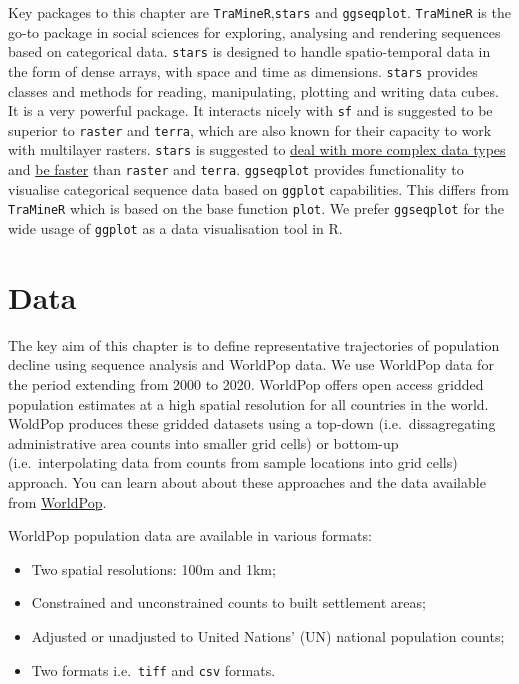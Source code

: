 \documentclass[
  letterpaper,
  DIV=11,
  numbers=noendperiod]{scrreprt}
\begin{document}
Key packages to this chapter are \texttt{TraMineR},\texttt{stars} and
\texttt{ggseqplot}. \texttt{TraMineR} is the go-to package in social
sciences for exploring, analysing and rendering sequences based on
categorical data. \texttt{stars} is designed to handle spatio-temporal
data in the form of dense arrays, with space and time as dimensions.
\texttt{stars} provides classes and methods for reading, manipulating,
plotting and writing data cubes. It is a very powerful package. It
interacts nicely with \texttt{sf} and is suggested to be superior to
\texttt{raster} and \texttt{terra}, which are also known for their
capacity to work with multilayer rasters. \texttt{stars} is suggested to
\href{https://r-spatial.github.io/stars/}{deal with more complex data
types} and
\href{https://www.r-bloggers.com/2021/05/a-comparison-of-terra-and-stars-packages/}{be
faster} than \texttt{raster} and \texttt{terra}. \texttt{ggseqplot}
provides functionality to visualise categorical sequence data based on
\texttt{ggplot} capabilities. This differs from \texttt{TraMineR} which
is based on the base function \texttt{plot}. We prefer
\texttt{ggseqplot} for the wide usage of \texttt{ggplot} as a data
visualisation tool in R.

\hypertarget{data}{%
\section{Data}\label{data}}

The key aim of this chapter is to define representative trajectories of
population decline using sequence analysis and WorldPop data. We use
WorldPop data for the period extending from 2000 to 2020. WorldPop
offers open access gridded population estimates at a high spatial
resolution for all countries in the world. WoldPop produces these
gridded datasets using a top-down (i.e.~dissagregating administrative
area counts into smaller grid cells) or bottom-up (i.e.~interpolating
data from counts from sample locations into grid cells) approach. You
can learn about about these approaches and the data available from
\href{https://www.worldpop.org}{WorldPop}.

WorldPop population data are available in various formats:

\begin{itemize}
\item
  Two spatial resolutions: 100m and 1km;
\item
  Constrained and unconstrained counts to built settlement areas;
\item
  Adjusted or unadjusted to United Nations' (UN) national population
  counts;
\item
  Two formats i.e.~\texttt{tiff} and \texttt{csv} formats.
\end{itemize}
\end{document}
